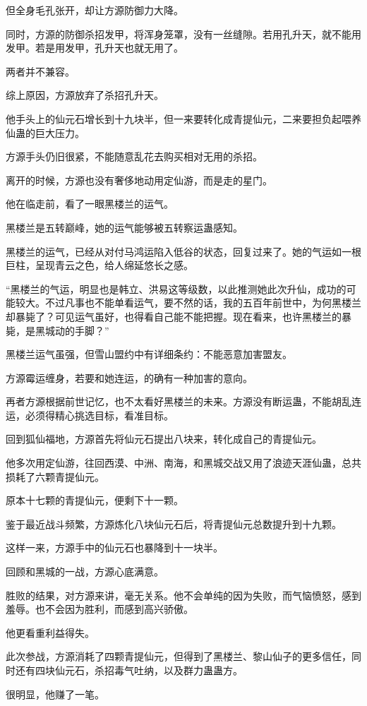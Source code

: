 \begin{this_body}
但全身毛孔张开，却让方源防御力大降。

同时，方源的防御杀招发甲，将浑身笼罩，没有一丝缝隙。若用孔升天，就不能用发甲。若是用发甲，孔升天也就无用了。

两者并不兼容。

综上原因，方源放弃了杀招孔升天。

他手头上的仙元石增长到十九块半，但一来要转化成青提仙元，二来要担负起喂养仙蛊的巨大压力。

方源手头仍旧很紧，不能随意乱花去购买相对无用的杀招。

离开的时候，方源也没有奢侈地动用定仙游，而是走的星门。

他在临走前，看了一眼黑楼兰的运气。

黑楼兰是五转巅峰，她的运气能够被五转察运蛊感知。

黑楼兰的运气，已经从对付马鸿运陷入低谷的状态，回复过来了。她的气运如一根巨柱，呈现青云之色，给人绵延悠长之感。

“黑楼兰的气运，明显也是韩立、洪易这等级数，以此推测她此次升仙，成功的可能较大。不过凡事也不能单看运气，要不然的话，我的五百年前世中，为何黑楼兰却暴毙了？可见运气虽好，也得看自己能不能把握。现在看来，也许黑楼兰的暴毙，是黑城动的手脚？”

黑楼兰运气虽强，但雪山盟约中有详细条约：不能恶意加害盟友。

方源霉运缠身，若要和她连运，的确有一种加害的意向。

再者方源根据前世记忆，也不太看好黑楼兰的未来。方源没有断运蛊，不能胡乱连运，必须得精心挑选目标，看准目标。

回到狐仙福地，方源首先将仙元石提出八块来，转化成自己的青提仙元。

他多次用定仙游，往回西漠、中洲、南海，和黑城交战又用了浪迹天涯仙蛊，总共损耗了六颗青提仙元。

原本十七颗的青提仙元，便剩下十一颗。

鉴于最近战斗频繁，方源炼化八块仙元石后，将青提仙元总数提升到十九颗。

这样一来，方源手中的仙元石也暴降到十一块半。

回顾和黑城的一战，方源心底满意。

胜败的结果，对方源来讲，毫无关系。他不会单纯的因为失败，而气恼愤怒，感到羞辱。也不会因为胜利，而感到高兴骄傲。

他更看重利益得失。

此次参战，方源消耗了四颗青提仙元，但得到了黑楼兰、黎山仙子的更多信任，同时还有四块仙元石，杀招毒气吐纳，以及群力蛊蛊方。

很明显，他赚了一笔。


\end{this_body}
